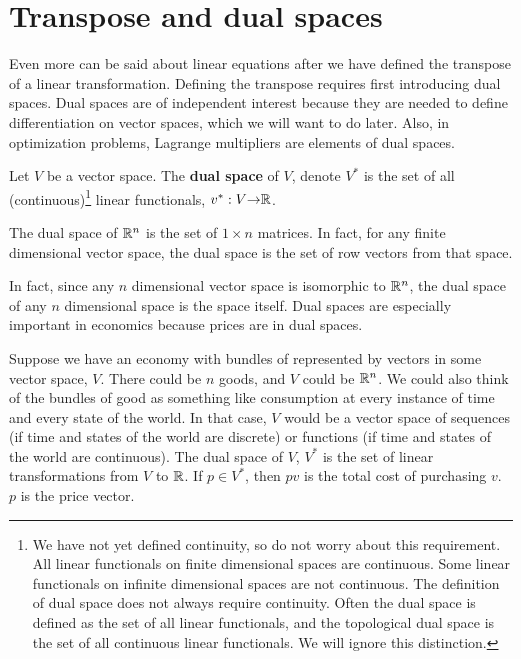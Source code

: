 \section{Transpose and dual spaces}

Even more can be said about linear equations after we have defined the
transpose of a linear transformation.  Defining the transpose requires
first introducing dual spaces. Dual spaces are of independent interest
because they are needed to define differentiation on vector spaces,
which we will want to do later. Also, in optimization problems, Lagrange
multipliers are elements of dual spaces. 
\begin{definition}
  Let $V$ be a vector space. The \textbf{dual space} of $V$, denote
  $V^\ast$ is the set of all (continuous)\footnote{We have not yet
    defined continuity, so do not worry about this requirement. All
    linear functionals on finite dimensional spaces are
    continuous. Some linear functionals on infinite dimensional spaces
    are not continuous. The definition of dual space does not always
    require continuity. Often the dual space is defined as the set of
    all linear functionals, and the topological dual space is the set
    of all continuous linear functionals. We will ignore this
    distinction.}  linear functionals, $v^\ast: V {\rightarrow} \mathbb{R}$.
\end{definition}

\begin{example}\label{ex:rdual}
  The dual space of $\mathbb{R}^n$ is the set of $1 \times n$ matrices. In
  fact, for any finite dimensional vector space, the dual space is the
  set of row vectors from that space. 
\end{example}
In fact, since any $n$ dimensional vector space is isomorphic to
$\mathbb{R}^n$, the dual space of any $n$ dimensional space is the space
itself. Dual spaces are especially important in economics because
prices are in dual spaces.
\begin{example}
  Suppose we have an economy with bundles of represented by vectors in
  some vector space, $V$. There could be $n$ goods, and $V$ could be
  $\mathbb{R}^n$. We could also think of the bundles of good as something like
  consumption at every instance of time and every state of the
  world. In that case, $V$ would be a vector space of sequences (if
  time and states of the world are discrete) or functions (if time and
  states of the world are continuous). The dual space of $V$, $V^\ast$
  is the set of linear transformations from $V$ to $\mathbb{R}$. If $p \in
  V^\ast$, then $pv$ is the total cost of purchasing $v$. $p$ is the
  price vector.
\end{example}

